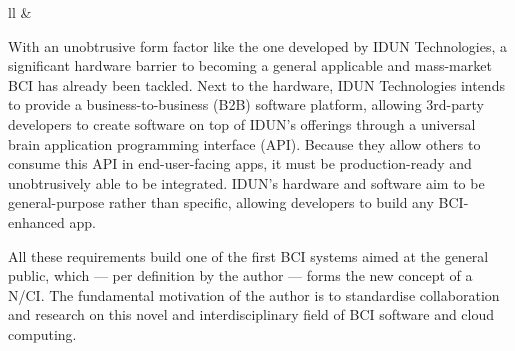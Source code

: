 \begin{table}[ht]
{\begin{tabular}{ll}
        &
                                                                                                               \\ \hline
    \end{tabular}%
  }
  \vspace{10pt}
  \caption{Axes label descriptions of the three-dimensionality for the definition of a N/CI as shown on \autoref{fig:nci-definition}.}
  \label{tab:nci-axis}
\end{table}

\newpage

With an unobtrusive form factor like the one developed by IDUN Technologies, a significant hardware barrier to becoming a general applicable and mass-market BCI has already been tackled. Next to the hardware, IDUN Technologies intends to provide a business-to-business (B2B) software platform, allowing 3rd-party developers to create software on top of IDUN's offerings through a universal brain application programming interface (API). Because they allow others to consume this API in end-user-facing apps, it must be production-ready and unobtrusively able to be integrated. IDUN's hardware and software aim to be general-purpose rather than specific, allowing developers to build any BCI-enhanced app.

All these requirements build one of the first BCI systems aimed at the general public, which — per definition by the author — forms the new concept of a N/CI. The fundamental motivation of the author is to standardise collaboration and research on this novel and interdisciplinary field of BCI software and cloud computing.

